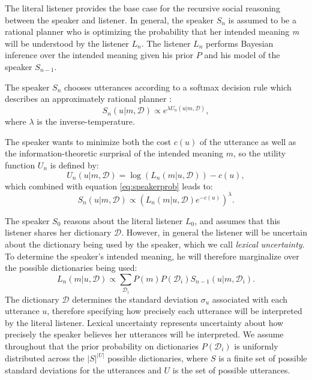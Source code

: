 \documentclass{article} %
\newcommand{\dictionary}{\ensuremath{\mathcal{D}}\xspace}
\begin{document}
The literal listener provides the base case for the recursive social reasoning between the speaker and listener. In general, the speaker $S_n$ is assumed to be a rational planner who is optimizing the probability that her intended meaning \emph{m} will be understood by the listener $L_n$. The listener $L_n$ performs Bayesian inference over the intended meaning given his prior $P$ and his model of the speaker $S_{n-1}$.

The speaker $S_n$ chooses utterances according to a softmax decision rule which describes an approximately rational planner \cite{sutton1998reinforcement}:
\begin{equation}\label{eq:speakerprob}
S_n(u | m,\dictionary) \propto e^{\lambda U_n(u | m,\dictionary)},
\end{equation}
where $\lambda$ is the inverse-temperature. 

The speaker wants to minimize both the cost $c(u)$ of the utterance as well as the information-theoretic surprisal of the intended meaning $m$, so the utility function $U_n$ is defined by:
\begin{equation}\label{eq:speakerutility}
U_n(u | m, \dictionary) = \log (L_{n}(m | u, \dictionary)) - c(u),
\end{equation}
which combined with equation \ref{eq:speakerprob} leads to:
\begin{equation}
S_n(u | m, \dictionary) \propto (L_{n}(m | u,\dictionary)e^{-c(u)}) ^\lambda.
\end{equation}

The speaker $S_0$ reasons about the literal listener $L_0$, and assumes that this listener shares her dictionary $\dictionary$. However, in general the listener will be uncertain about the dictionary being used by the speaker, which we call \emph{lexical uncertainty}. To determine the speaker's intended meaning, he will therefore marginalize over the possible dictionaries being used:
\begin{equation}
L_n(m|u,\dictionary) \propto \sum_{\dictionary_i }P(m)P(\dictionary_i)S_{n-1}(u | m,\dictionary_i).
\end{equation}
The dictionary $\dictionary$ determines the standard deviation $\sigma_u$ associated with each utterance $u$, therefore specifying how precisely each utterance will be interpreted by the literal listener. Lexical uncertainty represents uncertainty about how precisely the speaker believes her utterances will be interpreted. We assume throughout that the prior probability on dictionaries $P(\dictionary_i)$ is uniformly distributed across the $|S|^|U|$ possible dictionaries, where $S$ is a finite set of possible standard deviations for the utterances and $U$ is the set of possible utterances. 
\end{document}
